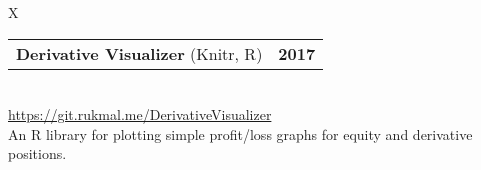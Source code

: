 \documentclass[10pt]{article}
\newcommand{\tabularxwidth}{\textwidth}
\begin{document}
        \begin{tabularx}{\tabularxwidth}{X}
                {
                    \begin{tabularx}{\tabularxwidth}{@{}X r}
                        \textbf{Derivative Visualizer}
                            (Knitr, R)
                        &
                        \textbf{
        2017} \\
                    \end{tabularx}
                } \\

            

            

            
                \url{https://git.rukmal.me/DerivativeVisualizer} \\
            

            
    An R library for plotting simple profit/loss graphs for equity and derivative positions. \\

        \end{tabularx}

        
            \vspace{.5em}
        

    
\end{document}
